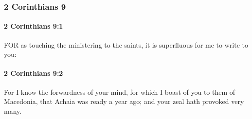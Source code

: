 	\subsubsection{2 Corinthians 9} %
		\label{2CORINTHIANS-9}
		
		\paragraph{2 Corinthians 9:1} %
			\label{2CORINTHIANS-9-1}

			FOR as touching the ministering to the saints, it is superfluous for me to write to you:

			\begin{framed}
			\scriptsize
				\begin{compactdesc}
					\item[SBLG] 
				\end{compactdesc}
			\end{framed}

		\paragraph{2 Corinthians 9:2} %
			\label{2CORINTHIANS-9-2}

			For I know the forwardness of your mind, for which I boast of you to them of Macedonia, that Achaia was ready a year ago; and your zeal hath provoked very many.

